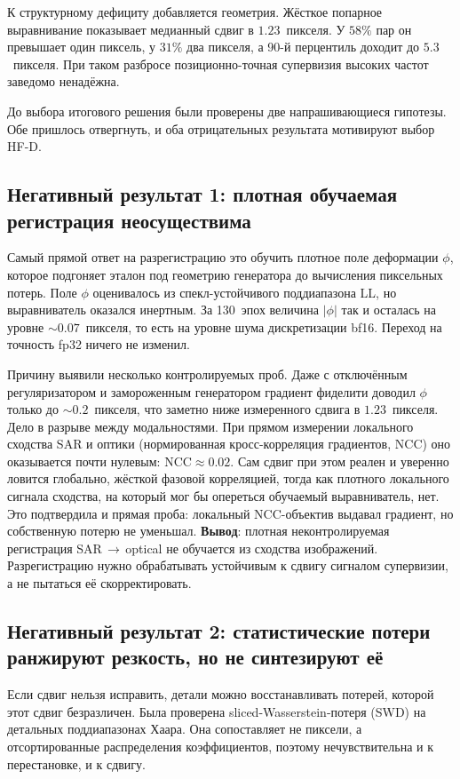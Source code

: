 К структурному дефициту добавляется геометрия. Жёсткое попарное выравнивание показывает медианный сдвиг в $1.23$~пикселя.
У $58\%$ пар он превышает один пиксель, у $31\%$ два пикселя, а 90-й перцентиль доходит
до $5.3$~пикселя. При таком разбросе позиционно-точная супервизия высоких частот
заведомо ненадёжна.

До выбора итогового решения были проверены две напрашивающиеся гипотезы. Обе
пришлось отвергнуть, и оба отрицательных результата мотивируют выбор HF-D.

\subsection{Негативный результат 1: плотная обучаемая регистрация неосуществима}

Самый прямой ответ на разрегистрацию это обучить плотное поле деформации $\phi$,
которое подгоняет эталон под геометрию генератора до вычисления пиксельных потерь.
Поле $\phi$ оценивалось из спекл-устойчивого поддиапазона LL, но выравниватель
оказался инертным. За 130~эпох величина $|\phi|$ так и осталась на уровне
$\sim 0.07$~пикселя, то есть на уровне шума дискретизации bf16. Переход на точность fp32
ничего не изменил.

Причину выявили несколько контролируемых проб. Даже с отключённым регуляризатором
и замороженным генератором градиент фиделити доводил $\phi$ только до
$\sim 0.2$~пикселя, что заметно ниже измеренного сдвига в $1.23$~пикселя. Дело
в разрыве между модальностями. При прямом измерении локального сходства SAR и оптики
(нормированная кросс-корреляция градиентов, $\mathrm{NCC}$) оно оказывается почти
нулевым: $\mathrm{NCC}\approx 0.02$. Сам сдвиг при этом реален и уверенно ловится
глобально, жёсткой фазовой корреляцией, тогда как плотного локального сигнала
сходства, на который мог бы опереться обучаемый выравниватель, нет. Это подтвердила
и прямая проба: локальный NCC-объектив выдавал градиент, но собственную потерю не
уменьшал.
\textbf{Вывод}: плотная неконтролируемая регистрация SAR\,$\to$\,optical не обучается
из сходства изображений. Разрегистрацию нужно обрабатывать устойчивым к сдвигу
сигналом супервизии, а не пытаться её скорректировать.

\subsection{Негативный результат 2: статистические потери ранжируют резкость, но не синтезируют её}

Если сдвиг нельзя исправить, детали можно восстанавливать потерей, которой этот
сдвиг безразличен. Была проверена sliced-Wasserstein-потеря (SWD) на детальных
поддиапазонах Хаара. Она сопоставляет не пиксели, а отсортированные распределения
коэффициентов, поэтому нечувствительна и к перестановке, и к сдвигу.

